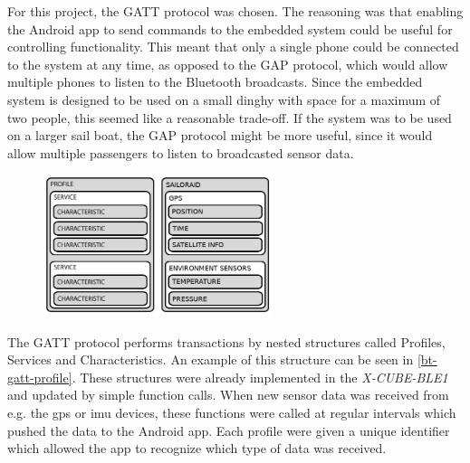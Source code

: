 For this project, the GATT protocol was chosen. The reasoning was that enabling the Android app to send commands to the embedded system could be useful for controlling functionality. This meant that only a single phone could be connected to the system at any time, as opposed to the GAP protocol, which would allow multiple phones to listen to the Bluetooth broadcasts. Since the embedded system is designed to be used on a small dinghy with space for a maximum of two people, this seemed like a reasonable trade-off. If the system was to be used on a larger sail boat, the GAP protocol might be more useful, since it would allow multiple passengers to listen to broadcasted sensor data.
\begin{figure}[H]
\centering
\includegraphics[width=0.6\textwidth]{Figures/bt_gatt_profile.png}
\label{bt-gatt-profile}
\end{figure}

The GATT protocol performs transactions by nested structures called Profiles, Services and Characteristics. An example of this structure can be seen in \autoref{bt-gatt-profile}. These structures were already implemented in the \emph{X-CUBE-BLE1} and updated by simple function calls. When new sensor data was received from e.g. the \gls{gps} or \gls{imu} devices, these functions were called at regular intervals which pushed the data to the Android app. Each profile were given a unique identifier which allowed the app to recognize which type of data was received.

